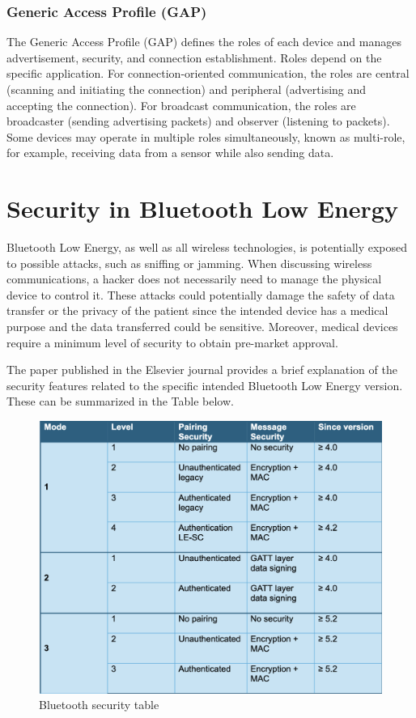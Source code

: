 \documentclass{Configuration_Files/PoliMi3i_thesis}
\begin{document}
\subsubsection{Generic Access Profile (GAP)}
The Generic Access Profile (GAP) defines the roles of each device and manages advertisement, security, and connection establishment. Roles depend on the specific application. For connection-oriented communication, the roles are central (scanning and initiating the connection) and peripheral (advertising and accepting the connection). For broadcast communication, the roles are broadcaster (sending advertising packets) and observer (listening to packets). Some devices may operate in multiple roles simultaneously, known as multi-role, for example, receiving data from a sensor while also sending data.


\section{Security in Bluetooth Low Energy}

Bluetooth Low Energy, as well as all wireless technologies, is potentially exposed to possible attacks, such as sniffing or jamming. When discussing wireless communications, a hacker does not necessarily need to manage the physical device to control it. These attacks could potentially damage the safety of data transfer or the privacy of the patient since the intended device has a medical purpose and the data transferred could be sensitive. Moreover, medical devices require a minimum level of security to obtain pre-market approval.

The paper published in the Elsevier journal \cite{caesar2022survey} provides a brief explanation of the security features related to the specific intended Bluetooth Low Energy version. These can be summarized in the Table below.

\begin{figure}[H]
    \centering
    \includegraphics[scale=0.7]{Bluetooth_Security/1.png}
    \caption{Bluetooth security table \cite{casarSurveyBluetoothLow2022}}
    \label{bluetooth_sec_1}
\end{figure}
\end{document}
